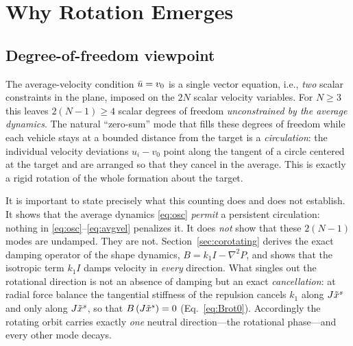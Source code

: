 \section{Why Rotation Emerges}
\label{sec:rotation}

\subsection{Degree-of-freedom viewpoint}
The average-velocity condition $\bar{u}=v_0$ is a single vector equation, i.e., \emph{two} scalar
constraints in the plane, imposed on the $2N$ scalar velocity variables. For $N\ge3$ this leaves
$2(N-1)\ge4$ scalar degrees of freedom \emph{unconstrained by the average dynamics}. The natural
``zero-sum'' mode that fills these degrees of freedom while each vehicle stays at a bounded distance
from the target is a \emph{circulation}: the individual velocity deviations $u_i-v_0$ point along the
tangent of a circle centered at the target and are arranged so that they cancel in the average. This
is exactly a rigid rotation of the whole formation about the target.

It is important to state precisely what this counting does and does not establish. It shows that the
average dynamics \eqref{eq:osc} \emph{permit} a persistent circulation: nothing in
\eqref{eq:osc}--\eqref{eq:avgvel} penalizes it. It does \emph{not} show that these $2(N-1)$ modes
are undamped. They are not. Section~\ref{sec:corotating} derives the exact damping operator of the
shape dynamics, $B=k_1I-\nabla^2P$, and shows that the isotropic term $k_1I$ damps velocity in
\emph{every} direction. What singles out the rotational direction is not an absence of damping but
an exact \emph{cancellation}: at radial force balance the tangential stiffness of the repulsion
cancels $k_1$ along $J\tilde{x}^s$ and only along $J\tilde{x}^s$, so that $B\,(J\tilde{x}^s)=0$
(Eq.~\eqref{eq:Brot0}). Accordingly the rotating orbit carries exactly \emph{one} neutral
direction---the rotational phase---and every other mode decays.

